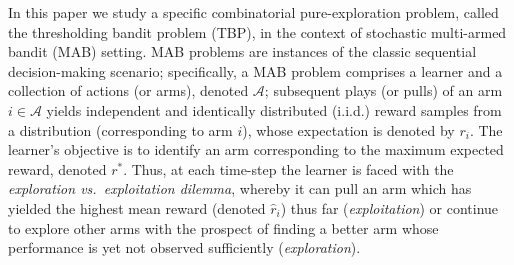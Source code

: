 In this paper we study a specific combinatorial pure-exploration problem, called the thresholding bandit problem (TBP), in the context of stochastic multi-armed bandit (MAB) setting. MAB problems are instances of the classic sequential decision-making scenario; specifically, a MAB problem comprises a learner and a collection of actions (or arms), denoted $\mathcal{A}$; subsequent plays (or pulls) of an arm $i\in\mathcal{A}$ yields independent and identically distributed (i.i.d.) reward samples from a distribution (corresponding to arm $i$), whose expectation is denoted by $r_i$. 
The learner's objective is to identify an arm corresponding to the maximum expected reward, denoted $r^{*}$. Thus, at each time-step the learner 
is faced with the \emph{exploration vs.\ exploitation dilemma}, whereby it can pull an arm which has yielded the highest mean reward (denoted $\hat{r}_{i}$) thus far (\emph{exploitation}) or continue to explore other arms with the prospect of finding a better arm 
whose performance is yet not observed sufficiently (\emph{exploration}).


